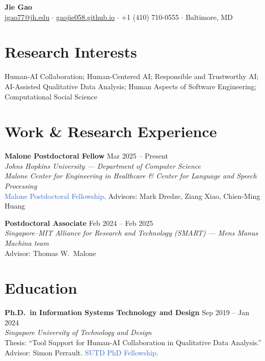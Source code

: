 \documentclass[11pt, letterpaper]{article}
\begin{document}
\begin{center}
{\LARGE\textbf{Jie Gao}} \\[6pt]
\href{mailto:jgao77@jh.edu}{jgao77@jh.edu} $\cdot$ \href{https://gaojie058.github.io}{gaojie058.github.io} $\cdot$ +1 (410) 710-0555 $\cdot$ Baltimore, MD
\end{center}

\vspace{6pt}

\section{Research Interests}
Human-AI Collaboration; Human-Centered AI; Responsible and Trustworthy AI; AI-Assisted Qualitative Data Analysis; Human Aspects of Software Engineering; Computational Social Science

\section{Work \& Research Experience}

\textbf{Malone Postdoctoral Fellow} \hfill Mar 2025 -- Present \\
\textit{Johns Hopkins University --- Department of Computer Science} \\
\textit{Malone Center for Engineering in Healthcare \& Center for Language and Speech Processing} \\
\textcolor{highlight}{Malone Postdoctoral Fellowship}. Advisors: Mark Dredze, Ziang Xiao, Chien-Ming Huang

\vspace{12pt}

\textbf{Postdoctoral Associate} \hfill Feb 2024 -- Feb 2025 \\
\textit{Singapore--MIT Alliance for Research and Technology (SMART) --- Mens Manus Machina team} \\
Advisor: Thomas W.\ Malone

\section{Education}

\textbf{Ph.D.\ in Information Systems Technology and Design} \hfill Sep 2019 -- Jan 2024 \\
\textit{Singapore University of Technology and Design} \\
Thesis: ``Tool Support for Human-AI Collaboration in Qualitative Data Analysis.'' \\
Advisor: Simon Perrault. \textcolor{highlight}{SUTD PhD Fellowship}.
\end{document}
